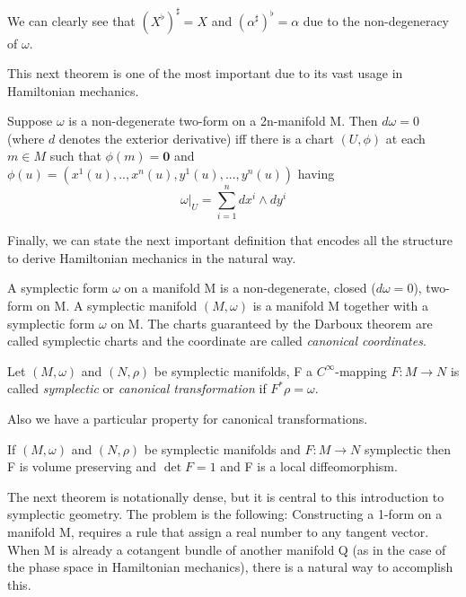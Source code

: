 \begin{remark}
	We can clearly see that $(X^\flat)^\sharp = X$ and $(\alpha^\sharp)^\flat = \alpha$ due to the non-degeneracy of $\omega$.
\end{remark}

This next theorem is one of the most important due to its vast usage in Hamiltonian mechanics. 

\begin{theorem}\label{thm:darboux}
	Suppose $\omega$ is a non-degenerate two-form on a 2n-manifold M. Then $d \omega = 0$ (where $d$ denotes the exterior derivative) iff there is a chart $(U, \phi)$ at each $m \in M$ such that $\phi(m) = \boldsymbol{0}$ and $\phi(u) = (x^1(u),..,x^n(u), y^1(u),...,y^n(u))$ having
	\[
		\omega|_U = \sum_{i=1}^n dx^i \wedge dy^i
	\]
\end{theorem}

Finally, we can state the next important definition that encodes all the structure to derive Hamiltonian mechanics in the natural way.

\begin{definition}\label{def:sympl-man}
	A symplectic form $\omega$ on a manifold M is a non-degenerate, closed ($d \omega = 0$), two-form on M. A symplectic manifold $(M, \omega)$ is a manifold M together with a symplectic form $\omega$ on M. The charts guaranteed by the Darboux theorem are called symplectic charts and the coordinate are called \emph{canonical coordinates}.
\end{definition}

\begin{definition}\label{def:canonical-transformation}
	Let $(M,\omega)$ and $(N,\rho)$ be symplectic manifolds, F a $C^\infty$-mapping $F:M \to N$ is called \emph{symplectic} or \emph{canonical transformation} if $F^*\rho = \omega$.
\end{definition}

Also we have a particular property for canonical transformations.
\begin{proposition}
	If $(M,\omega)$ and $(N,\rho)$ be symplectic manifolds and $F:M \to N$ symplectic then F is volume preserving and $\det F = 1$ and F is a local diffeomorphism.
\end{proposition}

The next theorem is notationally dense, but it is central to this introduction to symplectic geometry. The problem is the following: Constructing a 1-form on a manifold M, requires a rule that assign a real number to any tangent vector. When M is already a cotangent bundle of another manifold Q (as in the case of the phase space in Hamiltonian mechanics), there is a natural way to accomplish this.

